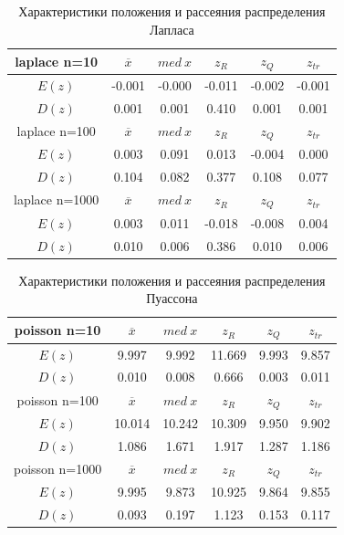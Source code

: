 \begin{table}[H]
	\begin{center}
		\begin{tabular}{|c||c|c|c|c|c|}
			\hline
			laplace n=10 & $\overline{x} $ & $med\:x$ & $z_{R}$ & $z_{Q}$ & $z_{tr}$ \\
			\hline\hline
			$E(z)$ & -0.001 & -0.000 & -0.011 & -0.002 & -0.001 \\
			\hline
			$D(z)$ & 0.001 & 0.001 & 0.410 & 0.001 & 0.001 \\
			\hline\hline
			laplace n=100 & $\overline{x} $ & $med\:x$ & $z_{R}$ & $z_{Q}$ & $z_{tr}$ \\
			\hline\hline
			$E(z)$ & 0.003 & 0.091 & 0.013 & -0.004 & 0.000 \\
			\hline
			$D(z)$ & 0.104 & 0.082 & 0.377 & 0.108 & 0.077 \\
			\hline\hline
			laplace n=1000 & $\overline{x} $ & $med\:x$ & $z_{R}$ & $z_{Q}$ & $z_{tr}$ \\
			\hline\hline
			$E(z)$ & 0.003 & 0.011 & -0.018 & -0.008 & 0.004 \\
			\hline
			$D(z)$ & 0.010 & 0.006 & 0.386 & 0.010 & 0.006 \\
			\hline
		\end{tabular}
	\end{center}
	\caption{Характеристики положения и рассеяния распределения Лапласа}
\end{table} 

\begin{table}[H]
	\begin{center}
		\begin{tabular}{|c||c|c|c|c|c|}
			\hline
			poisson n=10 & $\overline{x} $ & $med\:x$ & $z_{R}$ & $z_{Q}$ & $z_{tr}$ \\
			\hline\hline
			$E(z)$ & 9.997 & 9.992 & 11.669 & 9.993 & 9.857 \\
			\hline
			$D(z)$ & 0.010 & 0.008 & 0.666 & 0.003 & 0.011 \\
			\hline\hline
			poisson n=100 & $\overline{x} $ & $med\:x$ & $z_{R}$ & $z_{Q}$ & $z_{tr}$ \\
			\hline\hline
			$E(z)$ & 10.014 & 10.242 & 10.309 & 9.950 & 9.902 \\
			\hline
			$D(z)$ & 1.086 & 1.671 & 1.917 & 1.287 & 1.186 \\
			\hline\hline
			poisson n=1000 & $\overline{x} $ & $med\:x$ & $z_{R}$ & $z_{Q}$ & $z_{tr}$ \\
			\hline\hline
			$E(z)$ & 9.995 & 9.873 & 10.925 & 9.864 & 9.855 \\
			\hline
			$D(z)$ & 0.093 & 0.197 & 1.123 & 0.153 & 0.117 \\
			\hline
		\end{tabular}
	\end{center}
	\caption{Характеристики положения и рассеяния распределения Пуассона}
\end{table} 

